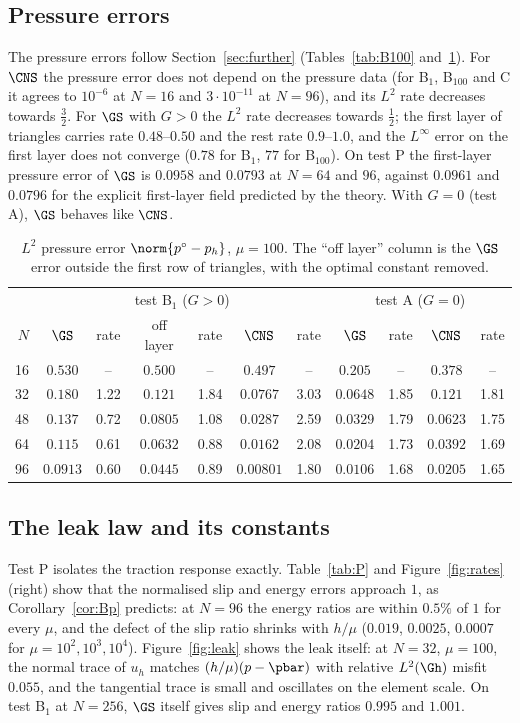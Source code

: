 \subsection{Pressure errors}
The pressure errors follow Section~\ref{sec:further} (Tables~\ref{tab:B100} and~\ref{tab:pB1}). For $\CNS$ the pressure error does not depend on the pressure data (for B$_1$, B$_{100}$ and C it agrees to $10^{-6}$ at $N=16$ and $3\cdot10^{-11}$ at $N=96$), and its $L^2$ rate decreases towards $\frac32$. For $\GS$ with $G>0$ the $L^2$ rate decreases towards $\frac12$; the first layer of triangles carries rate $0.48$--$0.50$ and the rest rate $0.9$--$1.0$, and the $L^\infty$ error on the first layer does not converge ($0.78$ for B$_1$, $77$ for B$_{100}$). On test P the first-layer pressure error of $\GS$ is $0.0958$ and $0.0793$ at $N=64$ and $96$, against $0.0961$ and $0.0796$ for the explicit first-layer field predicted by the theory. With $G=0$ (test A), $\GS$ behaves like $\CNS$.

\begin{table}[t]
\centering\small
\caption{$L^2$ pressure error $\norm{p^\circ-p_h}$, $\mu=100$. The ``off layer'' column is the $\GS$ error outside the first row of triangles, with the optimal constant removed.}\label{tab:pB1}
\begin{tabular}{rcccccc|cccc}
\toprule
 & \multicolumn{6}{c|}{test B$_1$ ($G>0$)} & \multicolumn{4}{c}{test A ($G=0$)}\\
$N$ & $\GS$ & rate & off layer & rate & $\CNS$ & rate & $\GS$ & rate & $\CNS$ & rate\\
\midrule
16 & $0.530$ & -- & $0.500$ & -- & $0.497$ & -- & $0.205$ & -- & $0.378$ & --\\
32 & $0.180$ & 1.22 & $0.121$ & 1.84 & $0.0767$ & 3.03 & $0.0648$ & 1.85 & $0.121$ & 1.81\\
48 & $0.137$ & 0.72 & $0.0805$ & 1.08 & $0.0287$ & 2.59 & $0.0329$ & 1.79 & $0.0623$ & 1.75\\
64 & $0.115$ & 0.61 & $0.0632$ & 0.88 & $0.0162$ & 2.08 & $0.0204$ & 1.73 & $0.0392$ & 1.69\\
96 & $0.0913$ & 0.60 & $0.0445$ & 0.89 & $0.00801$ & 1.80 & $0.0106$ & 1.68 & $0.0205$ & 1.65\\
\bottomrule
\end{tabular}
\end{table}

\subsection{The leak law and its constants}
Test P isolates the traction response exactly. Table~\ref{tab:P} and Figure~\ref{fig:rates} (right) show that the normalised slip and energy errors approach $1$, as Corollary~\ref{cor:Bp} predicts: at $N=96$ the energy ratios are within $0.5\%$ of $1$ for every $\mu$, and the defect of the slip ratio shrinks with $h/\mu$ ($0.019$, $0.0025$, $0.0007$ for $\mu=10^2,10^3,10^4$). Figure~\ref{fig:leak} shows the leak itself: at $N=32$, $\mu=100$, the normal trace of $u_h$ matches $(h/\mu)(p-\pbar)$ with relative $L^2(\Gh)$ misfit $0.055$, and the tangential trace is small and oscillates on the element scale. On test B$_1$ at $N=256$, $\GS$ itself gives slip and energy ratios $0.995$ and $1.001$.

